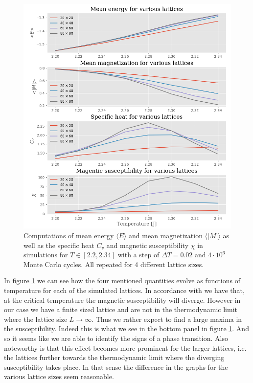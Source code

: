 \documentclass[12pt]{article}
\numberwithin{figure}{section}
\numberwithin{table}{section}
\begin{document}
\begin{figure}[ht]
 \centerline{\includegraphics[scale = 0.62]{phase_transitions}}
 \caption{Computations of mean energy $\langle E \rangle$ and mean magnetization $\langle |M| \rangle$ as well as the specific heat $C_v$ and magnetic susceptibility $\chi$ in simulations for $T\in[2.2,2.34]$ with a step of $\Delta T=0.02$ and $4\cdot10^6$ Monte Carlo cycles. All repeated for 4 different lattice sizes.}
 \label{fig:phase_transition}
\end{figure}

\noindent In figure \ref{fig:phase_transition} we can see how the four mentioned quantities evolve as functions of temperature for each of the simulated lattices. In accordance with \cite{Comp} we have that, at the critical temperature the magnetic susceptibility will diverge. However in our case we have a finite sized lattice and are not in the thermodynamic limit where the lattice size $L\to\infty$. Thus we rather expect to find a large maxima in the susceptibility. Indeed this is what we see in the bottom panel in figure \ref{fig:phase_transition}. And so it seems like we are able to identify the signs of a phase transition. Also noteworthy is that this effect becomes more prominent for the larger lattices, i.e. the lattices further towards the thermodynamic limit where the diverging susceptibility takes place. In that sense the difference in the graphs for the various lattice sizes seem reasonable.
\end{document}
